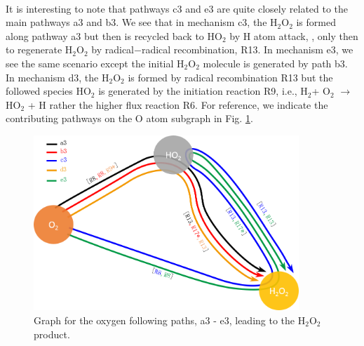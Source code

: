 \paragraph{}
It is interesting to note that pathways c3 and e3 are quite closely related to the main pathways a3 and b3. We see that in mechanism c3, the H$_2$O$_2$ is formed along pathway a3 but then is recycled back to HO$_2$ by H atom attack,
, only then to regenerate H$_2$O$_2$ by radical−radical recombination, R13. In mechanism e3, we see
the same scenario except the initial H$_2$O$_2$ molecule is generated
by path b3. In mechanism d3, the H$_2$O$_2$ is formed by radical
recombination R13 but the followed species HO$_2$ is generated
by the initiation reaction R9, i.e., H$_2$+ O$_2$ $\rightarrow$ HO$_2$ + H rather
the higher flux reaction R6. For reference, we indicate the
contributing pathways on the O atom subgraph in Fig. \ref{ch3:fig7}.
\begin{figure}[htbp]
	\caption[Graph for the oxygen following paths of H$_2$-O$_2$ combustion system]{Graph for the oxygen following paths, a3 - e3, leading to the H$_2$O$_2$ product.}
    \begin{center}
	\includegraphics[width=100mm]{figs/chapter3/fig7.png}
    \end{center}
\label{ch3:fig7}
\end{figure}
